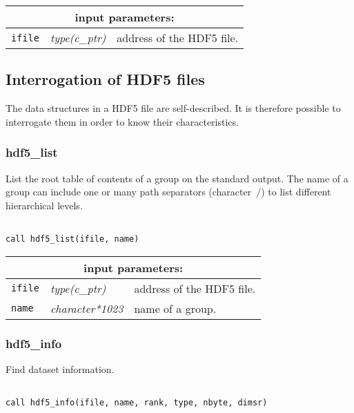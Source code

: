 \noindent
\begin{tabular}{|p{1.5cm}|p{3cm}|p{10cm}|}
\hline
\multicolumn{3}{|c|}{\bf input parameters:} \\
\hline
{\tt ifile} & {\it type(c\_ptr)} & address of the HDF5 file. \\
\hline
\end{tabular}

\vskip 0.8cm

\subsection{Interrogation of HDF5 files}

The data structures in a HDF5 file are self-described. It is therefore possible to
interrogate them in order to know their characteristics.

\subsubsection{hdf5\_list}

List the root table of contents of a group on the standard output. The name of a group can include one or many path separators (character~$\slash$)
to list different hierarchical levels.

\begin{verbatim}

call hdf5_list(ifile, name)
\end{verbatim}

\noindent
\begin{tabular}{|p{1.5cm}|p{3cm}|p{10cm}|}
\hline
\multicolumn{3}{|c|}{\bf input parameters:} \\
\hline
{\tt ifile} & {\it type(c\_ptr)} & address of the HDF5 file. \\
\hline
{\tt name} & {\it character*1023} & name of a group. \\
\hline
\end{tabular}

\subsubsection{hdf5\_info}

Find dataset information.

\begin{verbatim}

call hdf5_info(ifile, name, rank, type, nbyte, dimsr)
\end{verbatim}

